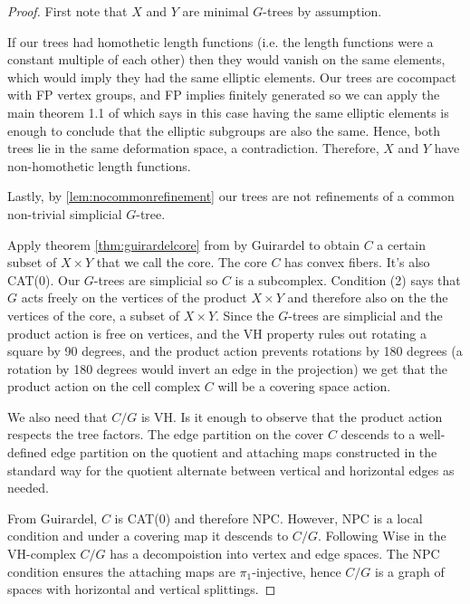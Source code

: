 \documentclass[12pt,parskip=full]{report}
\theoremstyle{plain}
\theoremstyle{definition}
\begin{document}
\begin{proof}
    First note that $X$ and $Y$ are minimal $G$-trees by assumption.
    
    If our trees had homothetic length functions (i.e. the length functions were a constant multiple of each other) then they would vanish on the same elements, which would imply they had the same elliptic elements. Our trees are cocompact with FP vertex groups, and FP implies finitely generated so we can apply the main theorem 1.1 of \cite{foresterdeformationrigidity} which says in this case having the same elliptic elements is enough to conclude that the elliptic subgroups are also the same. Hence, both trees lie in the same deformation space, a contradiction. Therefore, \(X\) and \(Y\) have non-homothetic length functions.
    
    Lastly, by \ref{lem:nocommonrefinement} our trees are not refinements of a common non-trivial simplicial $G$-tree.
    
    Apply theorem \ref{thm:guirardelcore} from \cite{guirardelcorepaper} by Guirardel to obtain $C$ a certain subset of $X \times Y$ that we call the core. The core \(C\) has convex fibers. It's also CAT(0). Our \(G\)-trees are simplicial so \(C\) is a subcomplex. Condition (2) says that $G$ acts freely on the vertices of the product $X\times Y$ and therefore also on the the vertices of the core, a subset of $X \times Y$. Since the \(G\)-trees are simplicial and the product action is free on vertices, and the VH property rules out rotating a square by 90 degrees, and the product action prevents rotations by 180 degrees (a rotation by 180 degrees would invert an edge in the projection) we get that the product action on the cell complex \(C\) will be a covering space action.
    
    We also need that $C/G$ is VH. Is it enough to observe that the product action respects the tree factors. The edge partition on the cover \(C\) descends to a well-defined edge partition on the quotient and attaching maps constructed in the standard way for the quotient alternate between vertical and horizontal edges as needed.
    
    From Guirardel, \(C\) is CAT(0) and therefore NPC. However, NPC is a local condition and under a covering map it descends to \(C/G\). Following Wise in \cite{wisethesis} the VH-complex \(C/G\) has a decompoistion into vertex and edge spaces. The NPC condition ensures the attaching maps are \(\pi_1\)-injective, hence \(C/G\) is a graph of spaces with horizontal and vertical splittings.
    

\end{proof}
\end{document}
